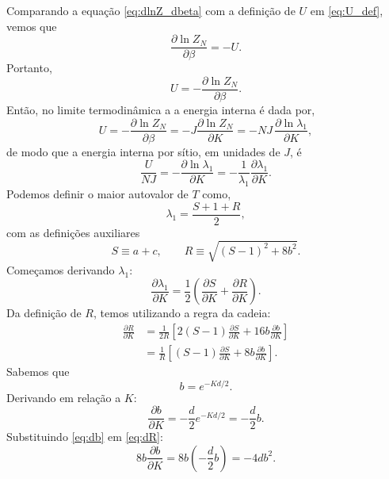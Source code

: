 \documentclass[11pt,a4paper]{article}
\newcommand{\pd}[2]{\frac{\partial #1}{\partial #2}}
\begin{document}
%
Comparando a equação \eqref{eq:dlnZ_dbeta} com a definição de \(U\) em \eqref{eq:U_def}, vemos que
%
\begin{equation}
    \frac{\partial \ln Z_N}{\partial \beta} = -U.
\end{equation}
%
Portanto,
%
\begin{equation}
    U = - \frac{\partial \ln Z_N}{\partial \beta}.
    \label{eq:U_beta}
\end{equation}
%
Então, no limite termodinâmica a a energia interna é dada por, 
%
\begin{equation}
    U=-\pd{\ln Z_N}{\beta}=-J\pd{\ln Z_N}{K}=-NJ\,\pd{\ln\lambda_1}{K},
\end{equation}
%
de modo que a energia interna por sítio, em unidades de $J$, é
%
\begin{equation}
    \frac{U}{NJ}=-\pd{\ln\lambda_1}{K}
    =-\frac{1}{\lambda_1}\pd{\lambda_1}{K}.
    \label{eq:U_spin1}
\end{equation}
%
Podemos definir o maior autovalor de \(T\) como,
%
\begin{equation}
    \lambda_1 = \frac{S + 1 + R}{2},
\end{equation}
%
com as definições auxiliares
%
\begin{equation}
    S \equiv a + c,
    \qquad
    R \equiv \sqrt{(S - 1)^2 + 8b^2}.
\end{equation}
%
Começamos derivando \(\lambda_1\):
%
\begin{equation}
    \frac{\partial \lambda_1}{\partial K}
    = \frac{1}{2} \left( \frac{\partial S}{\partial K} + \frac{\partial R}{\partial K} \right).
    \label{eq:dlamb1}
\end{equation}
%
Da definição de \(R\), temos utilizando a regra da cadeia:
%
\begin{align}
    \frac{\partial R}{\partial K}
    &= \frac{1}{2R} \left[ 2(S - 1) \frac{\partial S}{\partial K} + 16 b \frac{\partial b}{\partial K} \right] \\
    &= \frac{1}{R} \left[ (S - 1) \frac{\partial S}{\partial K} + 8 b \frac{\partial b}{\partial K} \right].
    \label{eq:dR}
\end{align}
%
Sabemos que
%
\[
b = e^{-Kd/2}.
\]
%
Derivando em relação a \(K\):
%
\begin{equation}
    \frac{\partial b}{\partial K} = -\frac{d}{2} e^{-Kd/2} = -\frac{d}{2} b.
    \label{eq:db}
\end{equation}
%
Substituindo \eqref{eq:db} em \eqref{eq:dR}:
%
\begin{equation}
    8 b \frac{\partial b}{\partial K}
    = 8 b \left( -\frac{d}{2} b \right)
    = -4 d b^2.
\end{equation}
\end{document}
